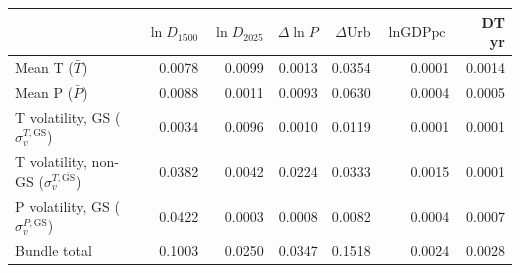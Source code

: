 \begin{tabular}{lrrrrrr}
\toprule
 & $\ln D_{1500}$ & $\ln D_{2025}$ & $\Delta\ln P$ & $\Delta\text{Urb}$ & $\ln\text{GDPpc}$ & DT yr \\
\midrule
Mean T ($\bar T$) & 0.0078 & 0.0099 & 0.0013 & 0.0354 & 0.0001 & 0.0014 \\
Mean P ($\bar P$) & 0.0088 & 0.0011 & 0.0093 & 0.0630 & 0.0004 & 0.0005 \\
T volatility, GS ($\sigma_v^{T,\mathrm{GS}}$) & 0.0034 & 0.0096 & 0.0010 & 0.0119 & 0.0001 & 0.0001 \\
T volatility, non-GS ($\sigma_v^{T,\overline{\mathrm{GS}}}$) & 0.0382 & 0.0042 & 0.0224 & 0.0333 & 0.0015 & 0.0001 \\
P volatility, GS ($\sigma_v^{P,\mathrm{GS}}$) & 0.0422 & 0.0003 & 0.0008 & 0.0082 & 0.0004 & 0.0007 \\
\midrule
Bundle total & 0.1003 & 0.0250 & 0.0347 & 0.1518 & 0.0024 & 0.0028 \\
\bottomrule
\end{tabular}
